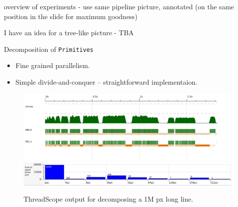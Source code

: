 \documentclass[slidestop,compress,mathserif, xcolor=table]{beamer}
\begin{document}
\begin{frame}

  
    overview of experiments - use same pipeline picture, annotated (on the same position in the slide for maximum goodness)

I have an idea for a tree-like picture - TBA

\end{frame}
\begin{frame}[c]{Decomposition of \texttt{Primitives}}
  \begin{itemize}
  \item Fine grained parallelism.
  \item Simple divide-and-conquer -- straightforward implementaion.
  \end{itemize}
  \begin{figure}[h!]
    \centering
    \includegraphics[width=0.7\linewidth]{../threadscope/lines/single-line-every-10}\\
    \includegraphics[width=0.7\linewidth]{../threadscope/lines/single-line-every-10-spark-times}
    \caption{ThreadScope output for decomposing a 1M px long line.}
  \label{fig:line-thread-sparks}

\end{figure}
\end{frame}
\end{document}
